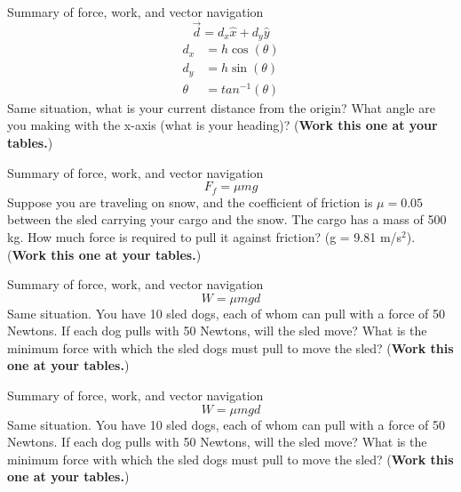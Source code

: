 \documentclass{beamer}
\begin{document}
\begin{frame}{Summary of force, work, and vector navigation}
\begin{equation}
\vec{d} = d_x\hat{x}+d_y\hat{y}
\end{equation}
\begin{align}
d_x &= h\cos(\theta) \\
d_y &= h\sin(\theta) \\
\theta &= tan^{-1}(\theta)
\end{align}
Same situation, what is your current distance from the origin?  What angle are you making with the x-axis (what is your heading)?  (\textbf{Work this one at your tables.})
\end{frame}

\begin{frame}{Summary of force, work, and vector navigation}
\begin{equation}
F_f = \mu m g
\end{equation}
Suppose you are traveling on snow, and the coefficient of friction is $\mu = 0.05$ between the sled carrying your cargo and the snow.  The cargo has a mass of 500 kg.  How much force is required to pull it against friction? (g = 9.81 m/s$^2$).  (\textbf{Work this one at your tables.})
\end{frame}

\begin{frame}{Summary of force, work, and vector navigation}
\begin{equation}
W = \mu m g d
\end{equation}
Same situation.  You have 10 sled dogs, each of whom can pull with a force of 50 Newtons.  If each dog pulls with 50 Newtons, will the sled move?  What is the minimum force with which the sled dogs must pull to move the sled?  (\textbf{Work this one at your tables.})
\end{frame}

\begin{frame}{Summary of force, work, and vector navigation}
\begin{equation}
W = \mu m g d
\end{equation}
Same situation.  You have 10 sled dogs, each of whom can pull with a force of 50 Newtons.  If each dog pulls with 50 Newtons, will the sled move?  What is the minimum force with which the sled dogs must pull to move the sled?  (\textbf{Work this one at your tables.})
\end{frame}
\end{document}
